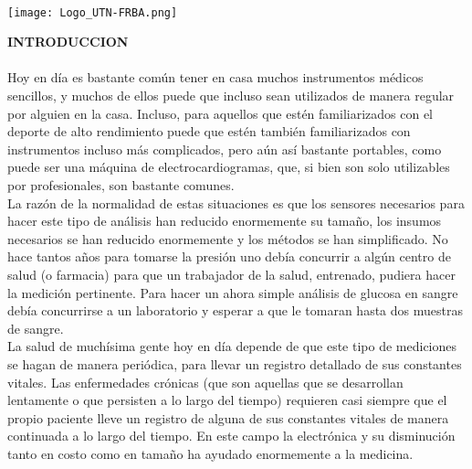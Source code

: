 \documentclass[11pt]{report}
\begin{document}
\begin{titlepage}
		
		\hfill
		\\[5cm]
		\hfill
		\vfill\vfill
		\texttt{[image: Logo\_UTN-FRBA.png]}\\[1cm] %
		
		
		\vfill %
		
	\end{titlepage}


\newpage
\noindent \Large \textbf{INTRODUCCION} \\
\\
Hoy en día es bastante común tener en casa muchos instrumentos médicos sencillos, y muchos de ellos puede que incluso sean  utilizados de manera regular por alguien en la casa. Incluso, para aquellos que estén familiarizados con el deporte de alto rendimiento puede que estén también familiarizados con instrumentos incluso más complicados, pero aún así bastante portables, como puede ser una máquina de electrocardiogramas, que, si bien son solo utilizables por profesionales, son bastante comunes. \\

La razón de la normalidad de estas situaciones es que los sensores necesarios para hacer este tipo de análisis han reducido enormemente su tamaño, los insumos necesarios se han reducido enormemente y los métodos se han simplificado. No hace tantos años para tomarse la presión uno debía concurrir a algún centro de salud (o
farmacia) para que un trabajador de la salud, entrenado, pudiera hacer la medición pertinente.  Para hacer un ahora simple análisis de glucosa en sangre debía  concurrirse a un laboratorio y esperar a que le tomaran hasta dos muestras de sangre.\\

La salud de muchísima gente hoy en día depende de que este tipo de mediciones se hagan de manera periódica, para llevar un registro detallado de sus constantes vitales. Las enfermedades crónicas (que son aquellas que se desarrollan lentamente o que persisten a lo largo del tiempo) requieren casi siempre que el propio paciente lleve un registro de
alguna de sus constantes vitales de manera continuada a lo largo del tiempo. En este campo la electrónica y su disminución tanto en costo como en tamaño ha ayudado enormemente a la medicina.\\
\end{document}
